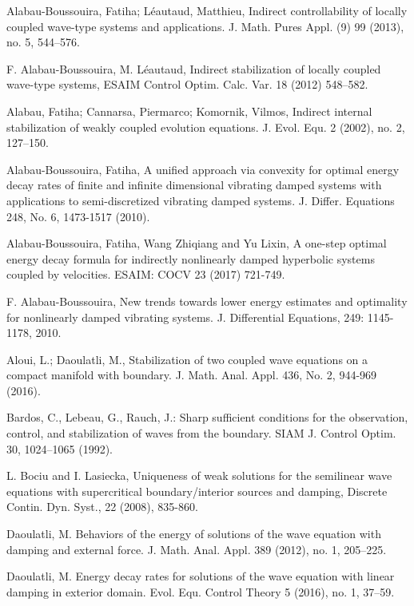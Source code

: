 \documentclass[11pt,reqno]{amsart}
\theoremstyle{plain}
\numberwithin{equation}{section}
\numberwithin{equation}{section}
\begin{document}
\begin{thebibliography}{99}
 Alabau-Boussouira, Fatiha; L\'{e}autaud,
Matthieu, Indirect controllability of locally coupled wave-type systems and
applications. J. Math. Pures Appl. (9) 99 (2013), no. 5, 544--576.

 F. Alabau-Boussouira, M. L\'{e}autaud,
Indirect stabilization of locally coupled wave-type systems, ESAIM Control
Optim. Calc. Var. 18 (2012) 548--582.

 Alabau, Fatiha; Cannarsa, Piermarco; Komornik,
Vilmos, Indirect internal stabilization of weakly coupled evolution
equations. J. Evol. Equ. 2 (2002), no. 2, 127--150.

 Alabau-Boussouira, Fatiha, A unified approach via
convexity for optimal energy decay rates of finite and infinite dimensional
vibrating damped systems with applications to semi-discretized vibrating
damped systems. J. Differ. Equations 248, No. 6, 1473-1517 (2010).

 Alabau-Boussouira, Fatiha, Wang Zhiqiang and Yu Lixin, A
one-step optimal energy decay formula for indirectly nonlinearly damped
hyperbolic systems coupled by velocities. ESAIM: COCV 23 (2017) 721-749.

 F. Alabau-Boussouira, New trends towards lower energy
estimates and optimality for nonlinearly damped vibrating systems. J.
Differential Equations, 249: 1145-1178, 2010.

 Aloui, L.; Daoulatli, M., Stabilization of two coupled
wave equations on a compact manifold with boundary. J. Math. Anal. Appl.
436, No. 2, 944-969 (2016).

 Bardos, C., Lebeau, G., Rauch, J.: Sharp sufficient conditions
for the observation, control, and stabilization of waves from the boundary.
SIAM J. Control Optim. 30, 1024--1065 (1992).

 L. Bociu and I. Lasiecka, Uniqueness of weak
solutions for the semilinear wave equations with supercritical
boundary/interior sources and damping, Discrete Contin. Dyn. Syst., 22
(2008), 835-860.

 Daoulatli, M. Behaviors of the energy of solutions of
the wave equation with damping and external force. J. Math. Anal. Appl. 389
(2012), no. 1, 205--225.

 Daoulatli, M. Energy decay rates for solutions of the
wave equation with linear damping in exterior domain. Evol. Equ. Control
Theory 5 (2016), no. 1, 37--59.


\end{thebibliography}
\end{document}

